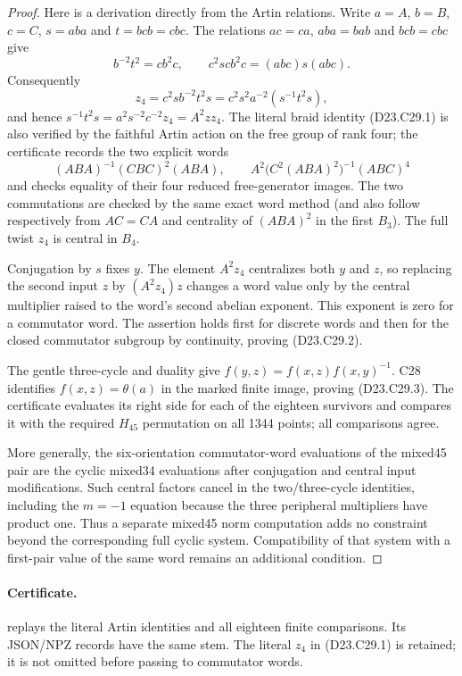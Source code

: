 \begin{proof}
Here is a derivation directly from the Artin relations.
Write $a=A$, $b=B$, $c=C$, $s=aba$ and $t=bcb=cbc$.
The relations $ac=ca$, $aba=bab$ and $bcb=cbc$ give
\[
 b^{-2}t^2=cb^2c,\qquad
 c^2scb^2c=(abc)s(abc).
\]
Consequently
\[
 z_4=c^2s b^{-2}t^2s
     =c^2s^2a^{-2}(s^{-1}t^2s),
\]
and hence $s^{-1}t^2s=a^2s^{-2}c^{-2}z_4=A^2zz_4$.
The literal braid identity (D23.C29.1) is also verified by the
faithful Artin action on the free group of rank four;
the certificate records the two explicit words
\[
 (ABA)^{-1}(CBC)^2(ABA),\qquad
 A^2\bigl(C^2(ABA)^2\bigr)^{-1}(ABC)^4
\]
and checks equality of their four reduced free-generator
images.  The two commutations are checked by the same
exact word method (and also follow respectively from
$AC=CA$ and centrality of $(ABA)^2$ in the first $B_3$).
The full twist $z_4$ is central in $B_4$.

Conjugation by $s$ fixes $y$.  The element $A^2z_4$
centralizes both $y$ and $z$, so replacing the second
input $z$ by $(A^2z_4)z$ changes a word value only by
the central multiplier raised to the word's second
abelian exponent.  This exponent is zero for a commutator
word.  The assertion holds first for discrete words and
then for the closed commutator subgroup by continuity,
proving (D23.C29.2).

The gentle three-cycle and duality give
$f(y,z)=f(x,z)f(x,y)^{-1}$.  C28 identifies
$f(x,z)=\theta(a)$ in the marked finite image, proving
(D23.C29.3).  The certificate evaluates its right side
for each of the eighteen survivors and compares it with
the required $H_{45}$ permutation on all 1344 points;
all comparisons agree.

More generally, the six-orientation commutator-word
evaluations of the mixed45 pair are the cyclic
mixed34 evaluations after conjugation and central
input modifications.  Such central factors cancel
in the two/three-cycle identities, including the
$m=-1$ equation because the three peripheral
multipliers have product one.  Thus a separate
mixed45 norm computation adds no constraint beyond
the corresponding full cyclic system.  Compatibility
of that system with a first-pair value of the same
word remains an additional condition.
\end{proof}

\paragraph{Certificate.}
replays the literal Artin identities and all eighteen
finite comparisons.  Its JSON/NPZ records have the same
stem.  The literal $z_4$ in (D23.C29.1) is retained;
it is not omitted before passing to commutator words.
